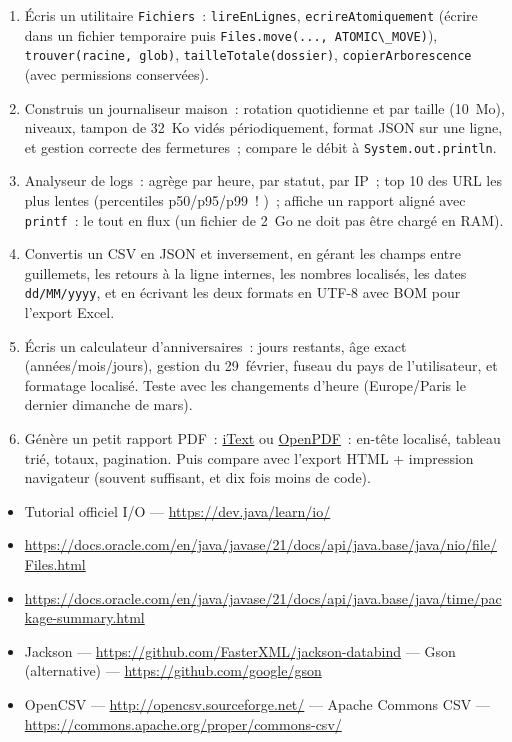 \documentclass[12pt,a4paper,twoside,openright]{book}
\newcommand{\link}[2]{\href{#2}{#1}}
\begin{document}
\begin{exercice}
\begin{enumerate}
  \item \'Ecris un utilitaire \verb|Fichiers|~: \verb|lireEnLignes|, \verb|ecrireAtomiquement|
        (\'ecrire dans un fichier temporaire puis \verb|Files.move(..., ATOMIC\_MOVE)|),
        \verb|trouver(racine, glob)|, \verb|tailleTotale(dossier)|, \verb|copierArborescence|
        (avec permissions conserv\'ees).
  \item Construis un journaliseur maison~: rotation quotidienne et par taille (10~Mo),
        niveaux, tampon de 32~Ko vid\'es p\'eriodiquement, format JSON sur une ligne,
        et gestion correcte des fermetures~; compare le d\'ebit \`a \verb|System.out.println|.
  \item Analyseur de logs~: agr\`ege par heure, par statut, par IP~; top 10 des URL les plus lentes
        (percentiles p50/p95/p99~! )~; affiche un rapport align\'e avec \verb|printf|~: le tout
        en flux (un fichier de 2~Go ne doit pas \^etre charg\'e en RAM).
  \item Convertis un CSV en JSON et inversement, en g\'erant les champs entre guillemets, les
        retours \`a la ligne internes, les nombres localis\'es, les dates \verb|dd/MM/yyyy|,
        et en \'ecrivant les deux formats en UTF-8 avec BOM pour l'export Excel.
  \item \'Ecris un calculateur d'anniversaires~: jours restants, \^age exact (ann\'ees/mois/jours),
        gestion du 29~f\'evrier, fuseau du pays de l'utilisateur, et formatage localis\'e.
        Teste avec les changements d'heure (Europe/Paris le dernier dimanche de mars).
  \item G\'en\`ere un petit rapport PDF~: \link{iText}{https://itextpdf.com/} ou
        \link{OpenPDF}{https://github.com/LibrePDF/OpenPDF}~: en-t\^ete localis\'e, tableau tri\'e,
        totaux, pagination. Puis compare avec l'export HTML + impression navigateur (souvent
        suffisant, et dix fois moins de code).
\end{enumerate}
\end{exercice}

\begin{ressources}
\begin{itemize}
  \item Tutorial officiel I/O --- \url{https://dev.java/learn/io/}
  \item \url{https://docs.oracle.com/en/java/javase/21/docs/api/java.base/java/nio/file/Files.html}
  \item \url{https://docs.oracle.com/en/java/javase/21/docs/api/java.base/java/time/package-summary.html}
  \item Jackson --- \url{https://github.com/FasterXML/jackson-databind} --- Gson (alternative) --- \url{https://github.com/google/gson}
  \item OpenCSV --- \url{http://opencsv.sourceforge.net/} --- Apache Commons CSV --- \url{https://commons.apache.org/proper/commons-csv/}
\end{itemize}
\end{ressources}
\end{document}
